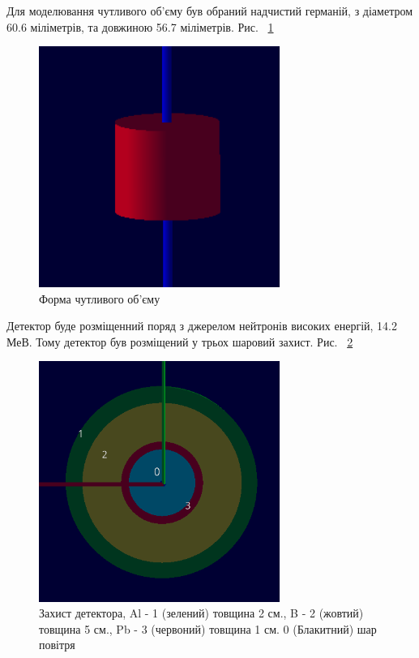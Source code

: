\documentclass[a4paper, 14pt]{article}
\numberwithin{equation}{section}
\numberwithin{table}{section}
\begin{document}
	Для моделювання чутливого об'єму був обраний надчистий германій, з діаметром 60.6 міліметрів, та довжиною 56.7 міліметрів. Рис. ~\ref{ris:s_detector_volume} 	
	\begin{figure}[hbt!]
		\centering \includegraphics[width=0.7\textwidth]{images/sDetector158cm3.png}
		\caption{Форма чутливого об'єму} 
		\label{ris:s_detector_volume}	
	\end{figure}
	
	Детектор буде розміщенний поряд з джерелом нейтронів високих енергій, 14.2 МеВ. Тому детектор був розміщений у трьох шаровий захист. Рис. ~\ref{ris:s_detector_P}	
	\begin{figure}[hbt!]
		\centering \includegraphics[width=0.7\textwidth]{images/dectorPrt.png}
		\caption{Захист детектора, Al - 1 (зелений) товщина 2 см., B - 2 (жовтий) товщина 5 см., Pb - 3 (червоний) товщина 1 см. 0 (Блакитний) шар повітря} 
		\label{ris:s_detector_P}	
	\end{figure} 
	
\end{document}

